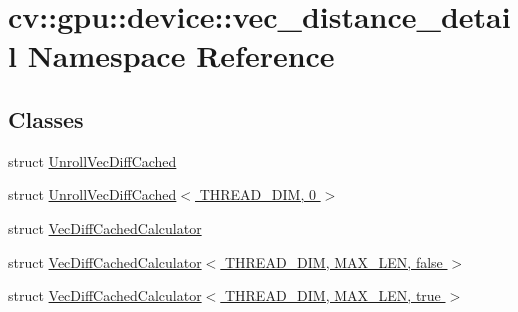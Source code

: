 \hypertarget{namespacecv_1_1gpu_1_1device_1_1vec__distance__detail}{\section{cv\-:\-:gpu\-:\-:device\-:\-:vec\-\_\-distance\-\_\-detail Namespace Reference}
\label{namespacecv_1_1gpu_1_1device_1_1vec__distance__detail}
}
\subsection*{Classes}
\begin{DoxyCompactItemize}
\item 
struct \hyperlink{structcv_1_1gpu_1_1device_1_1vec__distance__detail_1_1UnrollVecDiffCached}{Unroll\-Vec\-Diff\-Cached}
\item 
struct \hyperlink{structcv_1_1gpu_1_1device_1_1vec__distance__detail_1_1UnrollVecDiffCached_3_01THREAD__DIM_00_010_01_4}{Unroll\-Vec\-Diff\-Cached$<$ T\-H\-R\-E\-A\-D\-\_\-\-D\-I\-M, 0 $>$}
\item 
struct \hyperlink{structcv_1_1gpu_1_1device_1_1vec__distance__detail_1_1VecDiffCachedCalculator}{Vec\-Diff\-Cached\-Calculator}
\item 
struct \hyperlink{structcv_1_1gpu_1_1device_1_1vec__distance__detail_1_1VecDiffCachedCalculator_3_01THREAD__DIM_00_01MAX__LEN_00_01false_01_4}{Vec\-Diff\-Cached\-Calculator$<$ T\-H\-R\-E\-A\-D\-\_\-\-D\-I\-M, M\-A\-X\-\_\-\-L\-E\-N, false $>$}
\item 
struct \hyperlink{structcv_1_1gpu_1_1device_1_1vec__distance__detail_1_1VecDiffCachedCalculator_3_01THREAD__DIM_00_01MAX__LEN_00_01true_01_4}{Vec\-Diff\-Cached\-Calculator$<$ T\-H\-R\-E\-A\-D\-\_\-\-D\-I\-M, M\-A\-X\-\_\-\-L\-E\-N, true $>$}
\end{DoxyCompactItemize}
